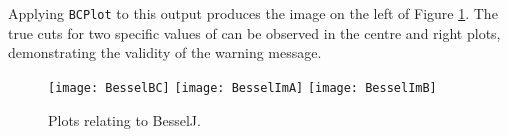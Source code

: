 \documentclass{llncs}
\begin{document}
Applying \texttt{BCPlot} to this output produces the image on the left of Figure \ref{fig:Bessel}.  The true cuts for two specific values of  can be observed in the centre and right plots, demonstrating the validity of the warning message.

\begin{figure}[hb] 
\begin{center}
\texttt{[image: BesselBC]}
\hspace*{0.3cm}
\texttt{[image: BesselImA]}
\hspace*{0.3cm}
\texttt{[image: BesselImB]}
\end{center}
\caption{Plots relating to BesselJ.} 
\label{fig:Bessel}
\end{figure}
\end{document}
